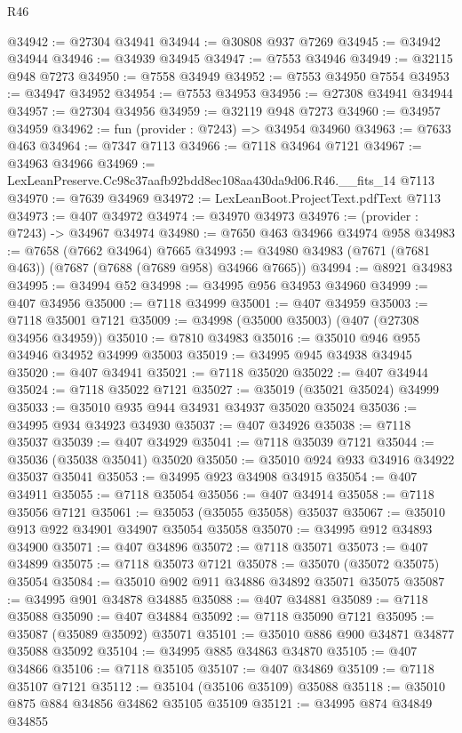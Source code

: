 \begin{lexlean}{R46}
\begin{coremodule}
@34942 := @27304 @34941
@34944 := @30808 @937 @7269
@34945 := @34942 @34944
@34946 := @34939 @34945
@34947 := @7553 @34946
@34949 := @32115 @948 @7273
@34950 := @7558 @34949
@34952 := @7553 @34950 @7554
@34953 := @34947 @34952
@34954 := @7553 @34953
@34956 := @27308 @34941 @34944
@34957 := @27304 @34956
@34959 := @32119 @948 @7273
@34960 := @34957 @34959
@34962 := fun (provider : @7243) => @34954 @34960
@34963 := @7633 @463
@34964 := @7347 @7113
@34966 := @7118 @34964 @7121
@34967 := @34963 @34966
@34969 := LexLeanPreserve.Cc98c37aafb92bdd8ec108aa430da9d06.R46.__fits_14 @7113
@34970 := @7639 @34969
@34972 := LexLeanBoot.ProjectText.pdfText @7113
@34973 := @407 @34972
@34974 := @34970 @34973
@34976 := (provider : @7243) -> @34967 @34974
@34980 := @7650 @463 @34966 @34974 @958
@34983 := @7658 (@7662 @34964) @7665
@34993 := @34980 @34983 (@7671 (@7681 @463)) (@7687 (@7688 (@7689 @958) @34966 @7665))
@34994 := @8921 @34983
@34995 := @34994 @52
@34998 := @34995 @956 @34953 @34960
@34999 := @407 @34956
@35000 := @7118 @34999
@35001 := @407 @34959
@35003 := @7118 @35001 @7121
@35009 := @34998 (@35000 @35003) (@407 (@27308 @34956 @34959))
@35010 := @7810 @34983
@35016 := @35010 @946 @955 @34946 @34952 @34999 @35003
@35019 := @34995 @945 @34938 @34945
@35020 := @407 @34941
@35021 := @7118 @35020
@35022 := @407 @34944
@35024 := @7118 @35022 @7121
@35027 := @35019 (@35021 @35024) @34999
@35033 := @35010 @935 @944 @34931 @34937 @35020 @35024
@35036 := @34995 @934 @34923 @34930
@35037 := @407 @34926
@35038 := @7118 @35037
@35039 := @407 @34929
@35041 := @7118 @35039 @7121
@35044 := @35036 (@35038 @35041) @35020
@35050 := @35010 @924 @933 @34916 @34922 @35037 @35041
@35053 := @34995 @923 @34908 @34915
@35054 := @407 @34911
@35055 := @7118 @35054
@35056 := @407 @34914
@35058 := @7118 @35056 @7121
@35061 := @35053 (@35055 @35058) @35037
@35067 := @35010 @913 @922 @34901 @34907 @35054 @35058
@35070 := @34995 @912 @34893 @34900
@35071 := @407 @34896
@35072 := @7118 @35071
@35073 := @407 @34899
@35075 := @7118 @35073 @7121
@35078 := @35070 (@35072 @35075) @35054
@35084 := @35010 @902 @911 @34886 @34892 @35071 @35075
@35087 := @34995 @901 @34878 @34885
@35088 := @407 @34881
@35089 := @7118 @35088
@35090 := @407 @34884
@35092 := @7118 @35090 @7121
@35095 := @35087 (@35089 @35092) @35071
@35101 := @35010 @886 @900 @34871 @34877 @35088 @35092
@35104 := @34995 @885 @34863 @34870
@35105 := @407 @34866
@35106 := @7118 @35105
@35107 := @407 @34869
@35109 := @7118 @35107 @7121
@35112 := @35104 (@35106 @35109) @35088
@35118 := @35010 @875 @884 @34856 @34862 @35105 @35109
@35121 := @34995 @874 @34849 @34855

\end{coremodule}
\end{lexlean}
